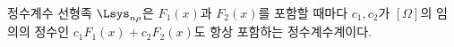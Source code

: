 
정수계수 선형족 $\Lsys_{n\rho}$은 $F_1(x)$과 $F_2(x)$를 포함할 때마다 $c_1,c_2$가 $[\Omega]$의 임의의 정수인 $c_1F_1(x)+c_2F_2(x)$도 항상 포함하는 정수계수계이다.
